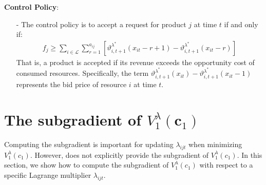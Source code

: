 \documentclass[11pt]{article}
\begin{document}
\vspace{0.5cm}

\noindent
\textbf{Control Policy}:
\begin{itemize}
\item[-] The control policy is to accept a request for product $j$ at time $t$ if and only if:
    \begin{align*}
        f_j \geq \sum_{i \in \mathcal{L}} \sum_{r = 1}^{a_{ij}} \left[ \vartheta^{\lambda^{*}}_{i,t+1}(x_{it} - r + 1) - \vartheta^{\lambda^{*}}_{i,t+1}(x_{it} - r) \right]
    \end{align*}
    That is, a product is accepted if its revenue exceeds the opportunity cost of consumed resources. 
    Specifically, the term $\vartheta^{\lambda^{*}}_{i,t+1}(x_{it}) - \vartheta^{\lambda^{*}}_{i,t+1}(x_{it} - 1)$ represents the bid price of resource $i$ at time $t$.
\end{itemize}

\vspace{0.5cm}



\newpage


\section{The subgradient of $V_1^\lambda(\mathbf{c}_1)$}

\noindent
Computing the subgradient is important for updating $\lambda_{ijt}$ when minimizing $V^{\lambda}_{1}(c_{1})$.
However, \cite{topaloglu2009using} does not explicitly provide the subgradient of $V^{\lambda}_{1}(c_{1})$.
In this section, we show how to compute the subgradient of $V^{\lambda}_{1}(c_{1})$ with respect to a specific Lagrange multiplier $\lambda_{ijt}$.

\vspace{0.5cm}
\end{document}
